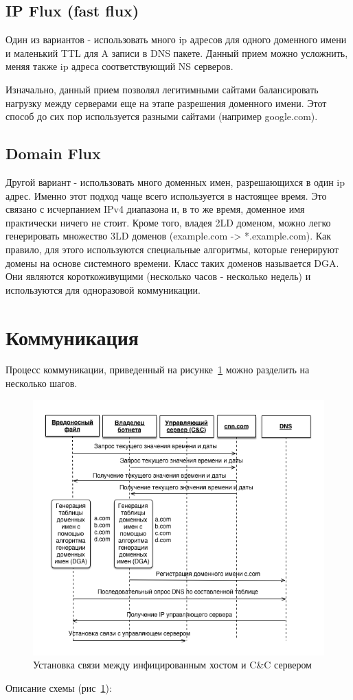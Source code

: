 \documentclass[a4paper,14pt]{extreport} %
\begin{document}
\subsection{IP Flux (fast flux)}
Один из вариантов - использовать много ip адресов для одного доменного имени и маленький TTL для A записи в DNS пакете. Данный прием можно усложнить, меняя также ip адреса соответствующий NS серверов.
	
Изначально, данный прием позволял легитимными сайтами балансировать нагрузку между серверами еще на этапе разрешения доменного имени. Этот способ до сих пор используется разными сайтами (например google.com).
	
\subsection{Domain Flux}
\label{ss:dflux}
Другой вариант - использовать много доменных имен, разрешающихся в один ip адрес. Именно этот подход чаще всего используется в настоящее время. Это связано с исчерпанием IPv4 диапазона и, в то же время, доменное имя практически ничего не стоит. Кроме того, владея 2LD доменом, можно легко генерировать множество 3LD доменов (example.com -> *.example.com).
Как правило, для этого используются специальные алгоритмы, которые генерируют домены на основе системного времени. Класс таких доменов называется DGA. Они являются короткоживущими (несколько часов - несколько недель) и используются для одноразовой коммуникации. 


\section{Коммуникация}
Процесс коммуникации, приведенный на рисунке~\ref{fig:comn} можно разделить на несколько шагов.
\begin{figure}[H]
	\centering
	\includegraphics[scale=0.75]{communicate.png}
	\caption{Установка связи между инфицированным хостом и C\&C сервером}
	\label{fig:comn}
\end{figure}
Описание схемы (рис~\ref{fig:comn}):
	
\end{document}
